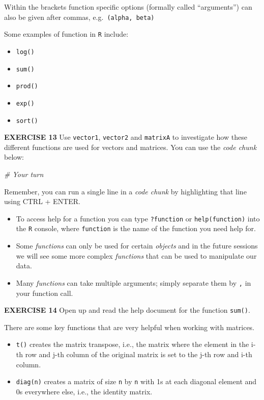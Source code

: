 \documentclass[
]{article}
\newenvironment{Shaded}{\begin{snugshade}}{\end{snugshade}}
\newcommand{\CommentTok}[1]{\textcolor[rgb]{0.56,0.35,0.01}{\textit{#1}}}
\begin{document}
Within the brackets function specific options (formally called
``arguments'') can also be given after commas,
e.g.~\texttt{(alpha,\ beta)}

Some examples of function in \texttt{R} include:

\begin{itemize}
\item
  \texttt{log()}
\item
  \texttt{sum()}
\item
  \texttt{prod()}
\item
  \texttt{exp()}
\item
  \texttt{sort()}
\end{itemize}

\textbf{EXERCISE 13} Use \texttt{vector1}, \texttt{vector2} and
\texttt{matrixA} to investigate how these different functions are used
for vectors and matrices. You can use the \emph{code chunk} below:

\begin{Shaded}
\begin{Highlighting}[]
\CommentTok{# Your turn}
\end{Highlighting}
\end{Shaded}

Remember, you can run a single line in a \emph{code chunk} by
highlighting that line using CTRL + ENTER.

\begin{itemize}
\item
  To access help for a function you can type \texttt{?function} or
  \texttt{help(function)} into the \texttt{R} console, where
  \texttt{function} is the name of the function you need help for.
\item
  Some \emph{functions} can only be used for certain \emph{objects} and
  in the future sessions we will see some more complex \emph{functions}
  that can be used to manipulate our data.
\item
  Many \emph{functions} can take multiple arguments; simply separate
  them by \texttt{,} in your function call.
\end{itemize}

\textbf{EXERCISE 14} Open up and read the help document for the function
\texttt{sum()}.

There are some key functions that are very helpful when working with
matrices.

\begin{itemize}
\item
  \texttt{t()} creates the matrix transpose, i.e., the matrix where the
  element in the i-th row and j-th column of the original matrix is set
  to the j-th row and i-th column.
\item
  \texttt{diag(n)} creates a matrix of size \texttt{n} by \texttt{n}
  with 1s at each diagonal element and 0s everywhere else, i.e., the
  identity matrix.
\end{itemize}
\end{document}
